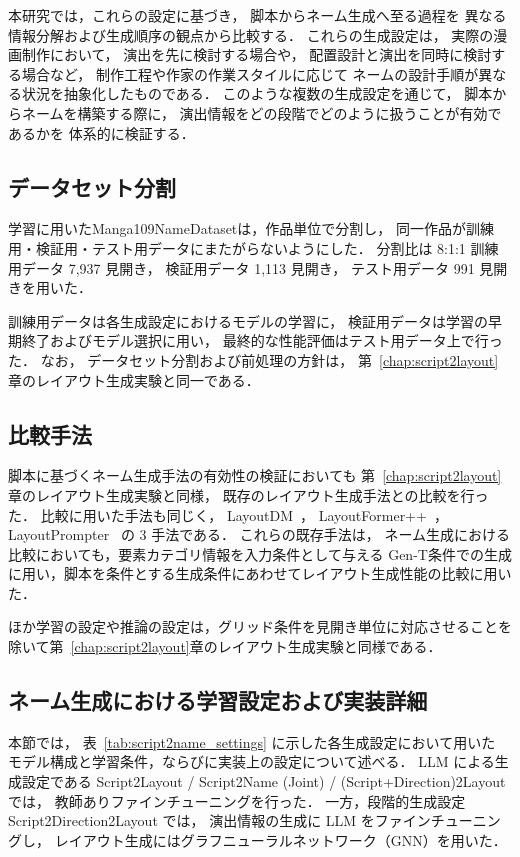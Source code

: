 \documentclass[a4j,12pt,dvipdfmx]{jsreport}
\begin{document}
本研究では，これらの設定に基づき，
脚本からネーム生成へ至る過程を
異なる情報分解および生成順序の観点から比較する．
これらの生成設定は，
実際の漫画制作において，
演出を先に検討する場合や，
配置設計と演出を同時に検討する場合など，
制作工程や作家の作業スタイルに応じて
ネームの設計手順が異なる状況を抽象化したものである．
このような複数の生成設定を通じて，
脚本からネームを構築する際に，
演出情報をどの段階でどのように扱うことが有効であるかを
体系的に検証する．

\subsection{データセット分割}
学習に用いたManga109NameDatasetは，作品単位で分割し，
同一作品が訓練用・検証用・テスト用データにまたがらないようにした．
分割比は 8:1:1
訓練用データ 7{,}937 見開き，
検証用データ 1{,}113 見開き，
テスト用データ 991 見開きを用いた．

訓練用データは各生成設定におけるモデルの学習に，
検証用データは学習の早期終了およびモデル選択に用い，
最終的な性能評価はテスト用データ上で行った．
なお，
データセット分割および前処理の方針は，
第~\ref{chap:script2layout}章のレイアウト生成実験と同一である．

\subsection{比較手法}
脚本に基づくネーム生成手法の有効性の検証においても
第~\ref{chap:script2layout}章のレイアウト生成実験と同様，
既存のレイアウト生成手法との比較を行った．
比較に用いた手法も同じく，
LayoutDM~\cite{inoue_layoutdm_2023}，
LayoutFormer++~\cite{jiang_layoutformer_2023}，
LayoutPrompter~\cite{lin_layoutprompter_2023}
の 3 手法である．
これらの既存手法は，
ネーム生成における比較においても，要素カテゴリ情報を入力条件として与える Gen-T条件での生成に用い，脚本を条件とする生成条件にあわせてレイアウト生成性能の比較に用いた．

ほか学習の設定や推論の設定は，グリッド条件を見開き単位に対応させることを除いて第~\ref{chap:script2layout}章のレイアウト生成実験と同様である．

\subsection{ネーム生成における学習設定および実装詳細}
本節では，
表~\ref{tab:script2name_settings} に示した各生成設定において用いた
モデル構成と学習条件，ならびに実装上の設定について述べる．
LLM による生成設定である Script2Layout / Script2Name (Joint) / (Script+Direction)2Layout では，
教師ありファインチューニングを行った．
一方，段階的生成設定 Script2Direction2Layout では，
演出情報の生成に LLM をファインチューニングし，
レイアウト生成にはグラフニューラルネットワーク（GNN）を用いた．
\end{document}
